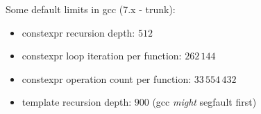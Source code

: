 Some default limits in gcc (7.x - trunk):
\begin{itemize}
\item constexpr recursion depth: $512$
\item constexpr loop iteration per function: $262\,144$
\item constexpr operation count per function: $33\,554\,432$
\item template recursion depth: $900$ (gcc \emph{might} segfault first)
\end{itemize}
